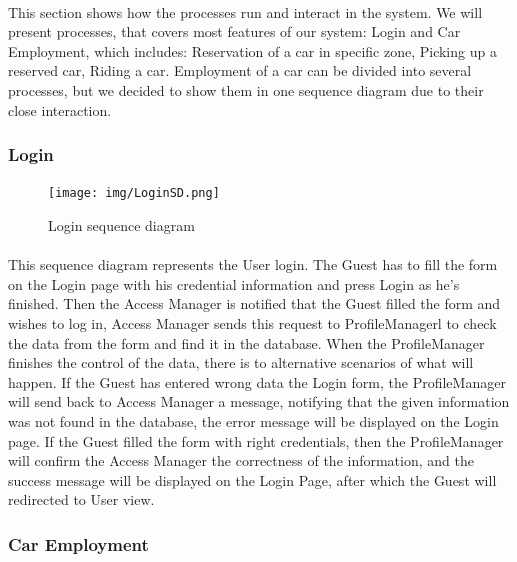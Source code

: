 	
		\paragraph{} This section shows how the processes run and interact in the system. 
		We will present processes, that covers most features of our system: Login and Car Employment, which includes: Reservation of a car in specific zone, Picking up a reserved car, Riding a car. Employment of a car can be divided into several processes, but we decided to show them in one sequence diagram due to their close interaction.    

	\subsubsection{Login}	
		\begin{figure}[h]
			\texttt{[image: img/LoginSD.png]}
			\caption{Login sequence diagram }
		\end{figure}
		
		\paragraph{} This sequence diagram represents the User login. 
		The Guest has to fill the form on the Login page with his credential information and press Login as he's finished. 
		Then the Access Manager is notified that the Guest filled the form and wishes to log in, Access Manager sends this request to ProfileManagerl to check the data from the form and find it in the database. When the ProfileManager finishes the control of the data, there is to alternative scenarios of what will happen. 
		If the Guest has entered wrong data the Login form, the ProfileManager will send back to Access Manager a message, notifying that the given information was not found in the database, the error message will be displayed on the Login page. 
		If the Guest filled the form with right credentials, then the ProfileManager will confirm the Access Manager the correctness of the information, and the success message will be displayed on the Login Page, after which the Guest will redirected to User view.           
			
	\newpage
	\subsubsection{Car Employment}	
	
